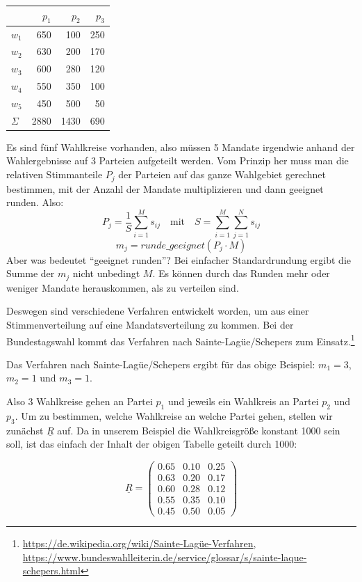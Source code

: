 \bigskip
\begin{center}
\begin{tabular}{l r r r}
  \toprule
           & $p_1$ & $p_2$ & $p_3$ \\
  \midrule
  $w_1$    & 650   & 100   & 250   \\
  $w_2$    & 630   & 200   & 170   \\
  $w_3$    & 600   & 280   & 120   \\
  $w_4$    & 550   & 350   & 100   \\
  $w_5$    & 450   & 500   & 50    \\
  \midrule
  $\Sigma$ & 2880  & 1430  & 690   \\
  \bottomrule
\end{tabular}
\end{center}
\bigskip

Es sind fünf Wahlkreise vorhanden, also müssen 5 Mandate irgendwie anhand der Wahlergebnisse auf
3 Parteien aufgeteilt werden. Vom Prinzip her muss man die relativen Stimmanteile $P_j$ der
Parteien auf das ganze Wahlgebiet gerechnet bestimmen, mit der Anzahl der Mandate multiplizieren
und dann geeignet runden. Also:
\[
  P_j = \frac{1}{S}\sum_{i=1}^{M} s_{ij}
  \quad \text{mit} \quad S = \sum_{i=1}^{M}\sum_{j=1}^{N} s_{ij}
\]
\[
  m_j = \textit{runde\_geeignet}(P_j \cdot M)
\]
Aber was bedeutet \enquote{geeignet runden}? Bei einfacher Standardrundung ergibt die Summe der
$m_j$ nicht unbedingt $M$. Es können durch das Runden mehr oder weniger Mandate herauskommen, als
zu verteilen sind.

Deswegen sind verschiedene Verfahren entwickelt worden, um aus einer Stimmenverteilung auf eine
Mandatsverteilung zu kommen. Bei der Bundestagswahl kommt das Verfahren nach Sainte-Lagüe/Schepers
zum Einsatz.\footnote{\url{https://de.wikipedia.org/wiki/Sainte-Lagüe-Verfahren},
\url{https://www.bundeswahlleiterin.de/service/glossar/s/sainte-laque-schepers.html}}

Das Verfahren nach Sainte-Lagüe/Schepers ergibt für das obige Beispiel:
$m_1 = 3$, $m_2 = 1$ und $m_3 = 1$.

Also 3 Wahlkreise gehen an Partei $p_1$ und jeweils ein Wahlkreis an Partei $p_2$ und $p_3$. Um
zu bestimmen, welche Wahlkreise an welche Partei gehen, stellen wir zunächst $\underline{R}$ auf.
Da in unserem Beispiel die Wahlkreisgröße konstant 1000 sein soll, ist das einfach der Inhalt
der obigen Tabelle geteilt durch 1000:

\[
  \underline{R} = \begin{pmatrix}
    0.65 & 0.10 & 0.25 \\
    0.63 & 0.20 & 0.17 \\
    0.60 & 0.28 & 0.12 \\
    0.55 & 0.35 & 0.10 \\
    0.45 & 0.50 & 0.05
  \end{pmatrix}
\]

